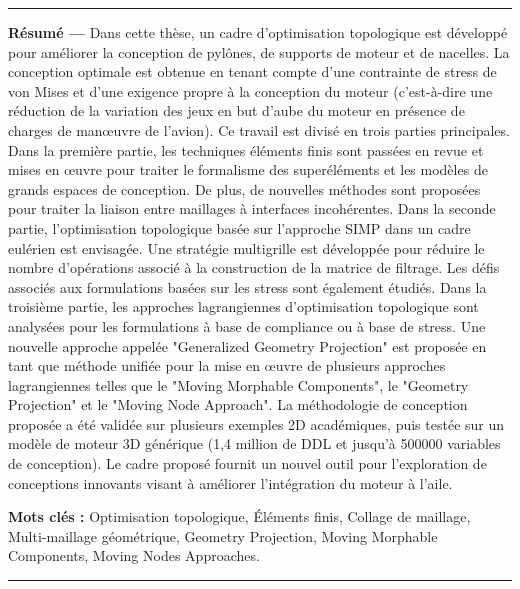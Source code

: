 \begin{vcenterpage}

\noindent\rule[2pt]{\textwidth}{0.5pt}

{\large\textbf{Résumé ---}}
    Dans cette thèse, un cadre d'optimisation topologique est développé pour améliorer la conception de pylônes, de supports de moteur et de nacelles. La conception optimale est obtenue en tenant compte d’une contrainte de stress de von Mises et d’une exigence propre à la conception du moteur (c’est-à-dire une réduction de la variation des jeux en but d'aube du moteur en présence de charges de manœuvre de l’avion). Ce travail est divisé en trois parties principales. Dans la première partie, les techniques éléments finis sont passées en revue et mises en œuvre pour traiter le formalisme des superéléments et les modèles de grands espaces de conception. De plus, de nouvelles méthodes sont proposées pour traiter la liaison entre maillages à interfaces incohérentes. Dans la seconde partie, l'optimisation topologique basée sur l'approche SIMP dans un cadre eulérien est envisagée. Une stratégie multigrille est développée pour réduire le nombre d'opérations associé à la construction de la matrice de filtrage. Les défis associés aux formulations basées sur les stress sont également étudiés. Dans la troisième partie, les approches lagrangiennes d’optimisation topologique sont analysées pour les formulations à base de compliance ou à base de stress. Une nouvelle approche appelée "Generalized Geometry Projection" est proposée en tant que méthode unifiée pour la mise en œuvre de plusieurs approches lagrangiennes telles que le "Moving Morphable Components", le "Geometry Projection" et le "Moving Node Approach". La méthodologie de conception proposée a été validée sur plusieurs exemples 2D académiques, puis testée sur un modèle de moteur 3D générique (1,4 million de DDL et jusqu'à 500000 variables de conception). Le cadre proposé fournit un nouvel outil pour l’exploration de conceptions innovants visant à améliorer l’intégration du moteur à l’aile.
    
    
    

{\large\textbf{Mots clés :}}
   Optimisation topologique, Éléments finis, Collage de maillage, Multi-maillage géométrique, Geometry Projection, Moving Morphable Components, Moving Nodes Approaches.
\\
\noindent\rule[2pt]{\textwidth}{0.5pt}
\end{vcenterpage}
\newpage
